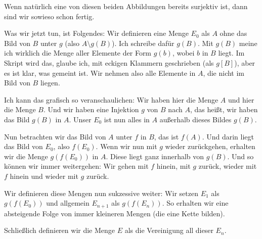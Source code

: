 \begin{math-stroke}
\end{math-stroke}

\begin{spoken-clean}[00:24:22 - 00:26:00]
Wenn natürlich eine von diesen beiden Abbildungen bereits surjektiv ist, dann sind wir sowieso schon fertig. 

Was wir jetzt tun, ist Folgendes: Wir definieren eine Menge $E_0$ als $A$ ohne das Bild von $B$ unter $g$ (also $A \setminus g(B)$). Ich schreibe dafür $g(B)$. Mit $g(B)$ meine ich wirklich die Menge aller Elemente der Form $g(b)$, wobei $b$ in $B$ liegt. Im Skript wird das, glaube ich, mit eckigen Klammern geschrieben (als $g[B]$), aber es ist klar, was gemeint ist. Wir nehmen also alle Elemente in $A$, die nicht im Bild von $B$ liegen.

Ich kann das grafisch so veranschaulichen: Wir haben hier die Menge $A$ und hier die Menge $B$. Und wir haben eine Injektion $g$ von $B$ nach $A$, das heißt, wir haben das Bild $g(B)$ in $A$. Unser $E_0$ ist nun alles in $A$ außerhalb dieses Bildes $g(B)$.
\end{spoken-clean}

\begin{spoken-clean}[00:26:00 - 00:27:30]
Nun betrachten wir das Bild von $A$ unter $f$ in $B$, das ist $f(A)$. Und darin liegt das Bild von $E_0$, also $f(E_0)$. Wenn wir nun mit $g$ wieder zurückgehen, erhalten wir die Menge $g(f(E_0))$ in $A$. Diese liegt ganz innerhalb von $g(B)$. Und so können wir immer weitergehen: Wir gehen mit $f$ hinein, mit $g$ zurück, wieder mit $f$ hinein und wieder mit $g$ zurück.

Wir definieren diese Mengen nun sukzessive weiter: Wir setzen $E_1$ als $g(f(E_0))$ und allgemein $E_{n+1}$ als $g(f(E_n))$. So erhalten wir eine absteigende Folge von immer kleineren Mengen (die eine Kette bilden).

Schließlich definieren wir die Menge $E$ als die Vereinigung all dieser $E_n$.
\end{spoken-clean}

